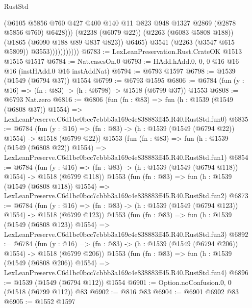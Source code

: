 \begin{lexlean}{RustStd}
\begin{coremodule}
                                (@6105
                                  @5856
                                  @760
                                  @427
                                  @400
                                  @140
                                  @11
                                  @823
                                  @948
                                  @1327
                                  @2869
                                  (@2878 @5856 @760)
                                  @6428)))
                            (@2238 (@6079 @22))
                            (@2263 (@6083 @5808 @188))
                            (@1865 (@6090 @188 @89 @837 @823))
                            @6465)
                          @3541
                          (@2263 (@3547 @615 @5809))
                          @3553)))))))))))
@6783 := LexLeanPreservation.Rust.CrateOK @1513 @1515 @1517
@6784 := Nat.casesOn.{0}
@6793 := HAdd.hAdd.{0, 0, 0} @16 @16 @16 (instHAdd.{0} @16 instAddNat)
@6794 := @6793 @1597
@6798 := @1539 (@1549 (@6794 @37)) @1554
@6799 := @6793 @1595
@6806 := @6784 (fun (y : @16) => (fn : @83) -> (h : @6798) -> @1518 (@6799 @37)) @1553
@6808 := @6793 Nat.zero
@6816 := @6806
    (fun (fn : @83) =>
    fun (h : @1539 (@1549 (@6808 @37)) @1554) =>
    LexLeanPreserve.C6d1bc0bcc7cbbb3a169c4e838883ff45.R40.RustStd.fun0)
@6835 := @6784
    (fun (y : @16) => (fn : @83) -> (h : @1539 (@1549 (@6794 @22)) @1554) -> @1518 (@6799 @22))
    @1553
    (fun (fn : @83) =>
    fun (h : @1539 (@1549 (@6808 @22)) @1554) =>
    LexLeanPreserve.C6d1bc0bcc7cbbb3a169c4e838883ff45.R40.RustStd.fun1)
@6854 := @6784
    (fun (y : @16) => (fn : @83) -> (h : @1539 (@1549 (@6794 @118)) @1554) -> @1518 (@6799 @118))
    @1553
    (fun (fn : @83) =>
    fun (h : @1539 (@1549 (@6808 @118)) @1554) =>
    LexLeanPreserve.C6d1bc0bcc7cbbb3a169c4e838883ff45.R40.RustStd.fun2)
@6873 := @6784
    (fun (y : @16) => (fn : @83) -> (h : @1539 (@1549 (@6794 @123)) @1554) -> @1518 (@6799 @123))
    @1553
    (fun (fn : @83) =>
    fun (h : @1539 (@1549 (@6808 @123)) @1554) =>
    LexLeanPreserve.C6d1bc0bcc7cbbb3a169c4e838883ff45.R40.RustStd.fun3)
@6892 := @6784
    (fun (y : @16) => (fn : @83) -> (h : @1539 (@1549 (@6794 @206)) @1554) -> @1518 (@6799 @206))
    @1553
    (fun (fn : @83) =>
    fun (h : @1539 (@1549 (@6808 @206)) @1554) =>
    LexLeanPreserve.C6d1bc0bcc7cbbb3a169c4e838883ff45.R40.RustStd.fun4)
@6896 := @1539 (@1549 (@6794 @112)) @1554
@6901 := Option.noConfusion.{0, 0} (@1518 (@6799 @112)) @83
@6902 := @816 @83
@6904 := @6901 @6902 @83
@6905 := @1552 @1597

\end{coremodule}
\end{lexlean}
